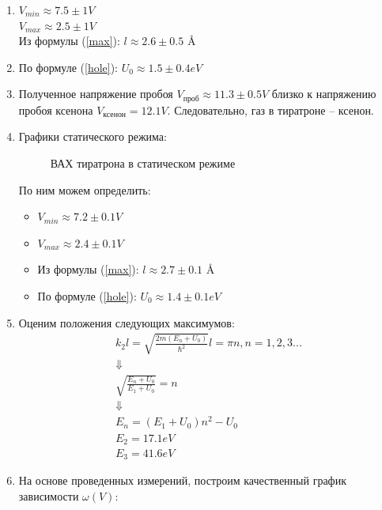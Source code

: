 \documentclass[12pt,a4paper]{article}
\begin{document}
\begin{enumerate}
\item
$V_{min} \approx 7.5 \pm 1 V$ \\
$V_{max} \approx 2.5 \pm 1 V$ \\
Из формулы (\ref{max}):
$l \approx 2.6 \pm 0.5$ {\AA}

\item
По формуле (\ref{hole}): $U_0 \approx 1.5 \pm 0.4 eV$

\item
Полученное напряжение пробоя $V_\text{проб} \approx 11.3 \pm 0.5 V$ близко к напряжению пробоя ксенона $V_\text{ксенон} = 12.1 V$. Следовательно, газ в тиратроне -- ксенон.

\item Графики статического режима:

\begin{figure}[ht!]\label{omega} 
\caption{ВАХ тиратрона в статическом режиме}
\end{figure}
 
 По ним можем определить:
 \begin{itemize}
 \item $V_{min} \approx 7.2 \pm 0.1 V$
 \item $V_{max} \approx 2.4 \pm 0.1 V$
 \item Из формулы (\ref{max}):
$l \approx 2.7 \pm 0.1$ {\AA}
\item 
По формуле (\ref{hole}): $U_0 \approx 1.4 \pm 0.1 eV$
 \end{itemize}

\item Оценим положения следующих максимумов:
\begin{gather*}
k_2l = \sqrt{\frac{2m(E_n+U_0)}{\hbar^2}}l = \pi n, n = 1, 2, 3... \\
\Downarrow \\
\sqrt{\frac{E_n + U_0}{E_1 + U_0}} = n \\
\Downarrow \\
E_n = (E_1 + U_0) n^2 - U_0 \\
E_2 = 17.1 eV \\
E_3 = 41.6 eV
\end{gather*}
\item 
На основе проведенных измерений, построим качественный график зависимости $\omega(V)$:


\end{enumerate}
\end{document}
